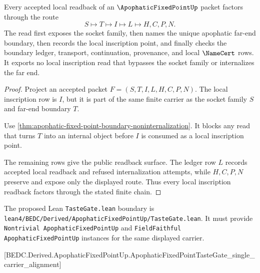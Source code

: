 \begin{theorem}
\label{thm:apophatic-fixed-point-local-inscription-readback}
Every accepted local readback of an $\ApophaticFixedPointUp$ packet factors through the route
$$
S \longmapsto T \longmapsto I \longmapsto L \longmapsto H,C,P,N .
$$
The read first exposes the socket family, then names the unique apophatic far-end boundary, then records the local inscription point, and finally checks the boundary ledger, transport, continuation, provenance, and local $\NameCert$ rows. It exports no local inscription read that bypasses the socket family or internalizes the far end.
\end{theorem}
\begin{proof}
Project an accepted packet $F=(S,T,I,L,H,C,P,N)$. The local inscription row is $I$, but it is part of the same finite carrier as the socket family $S$ and far-end boundary $T$.

Use \autoref{thm:apophatic-fixed-point-boundary-noninternalization}. It blocks any read that turns $T$ into an internal object before $I$ is consumed as a local inscription point.

The remaining rows give the public readback surface. The ledger row $L$ records accepted local readback and refused internalization attempts, while $H,C,P,N$ preserve and expose only the displayed route. Thus every local inscription readback factors through the stated finite chain.
\end{proof}



The proposed Lean \texttt{TasteGate.lean} boundary is \texttt{lean4/BEDC/Derived/ApophaticFixedPointUp/TasteGate.lean}. It must provide \texttt{Nontrivial ApophaticFixedPointUp} and \texttt{FieldFaithful ApophaticFixedPointUp} instances for the same displayed carrier.

[BEDC.Derived.ApophaticFixedPointUp.ApophaticFixedPointTasteGate\_single\_carrier\_alignment]

